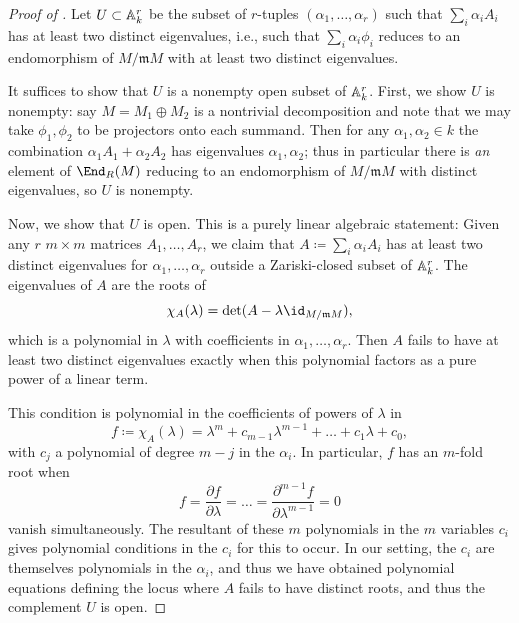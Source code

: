 \documentclass[12pt]{amsart}
\def\m{\mathfrak m}
\theoremstyle{theorem}
\numberwithin{thm}{section}
\theoremstyle{definition}
\begin{document}
\begin{proof}[Proof of ]
  Let $U\subset\AA_k^r$ be the subset of $r$-tuples $(\alpha_1,\dots,\alpha_r)$ such that $\sum_i\alpha_i A_i$ has at least two distinct eigenvalues, i.e., such that $\sum_i\alpha_i\phi_i$ reduces to an endomorphism of $M/\m M$ with at least two distinct eigenvalues. %
  \vadjust{\goodbreak}

  It suffices to show that $U$ is a nonempty open subset of $\AA_k^r$. First, we show $U$ is nonempty:
  say $M = M_1\oplus M_2$ is a nontrivial decomposition and note that we may take $\phi_1,\phi_2$ to be projectors onto each summand. Then for any $\alpha_1,\alpha_2\in k$ the combination $\alpha_1 A_1 + \alpha_2 A_2$ has eigenvalues $\alpha_1,\alpha_2$; thus in particular there is \emph{an} element of $\End_R(M)$ reducing to an endomorphism of $M/\m M$ with distinct eigenvalues, so $U$ is nonempty.

  Now, we show that $U$ is open. This is a purely linear algebraic statement: Given any $r$ $m\times m$ matrices $A_1,\dots,A_r$, we claim that $A \coloneqq \sum_i\alpha_i A_i$ has at least two distinct eigenvalues for $\alpha_1,\dots,\alpha_r$ outside a Zariski-closed subset of $\AA_k^r$.
  The eigenvalues of $A$ are the roots of
  $$ \chi_{A}(\lambda) = \det(A-\lambda \id_{M/\m M}), $$
  which is a polynomial in $\lambda$ with coefficients in $\alpha_1,\dots,\alpha_r$. Then $A$ fails to have at least two distinct eigenvalues exactly when this polynomial factors as a pure power of a linear term.

  This condition is polynomial in the coefficients of powers of $\lambda$ in
  \begin{equation}\label{eq:roots}
    f \coloneqq \chi_{A}(\lambda) = \lambda^m + c_{m-1} \lambda^{m-1} + \dots + c_1 \lambda + c_0,
  \end{equation}
  with $c_j$ a polynomial of degree $m-j$ in the $\alpha_i$. In particular, $f$ has an $m$-fold root when
  $$ f = \frac{\partial f}{\partial\lambda} = \dots = \frac{\partial^{m-1}f}{\partial\lambda^{m-1}} = 0 $$
  vanish simultaneously. The resultant of these $m$ polynomials in the $m$ variables $c_i$ gives polynomial conditions in the $c_i$ for this to occur.
  In our setting, the $c_i$ are themselves polynomials in the $\alpha_i$, and thus we have obtained polynomial equations defining the locus where $A$ fails to have distinct roots, and thus the complement $U$ is open.


\end{proof}
\end{document}
